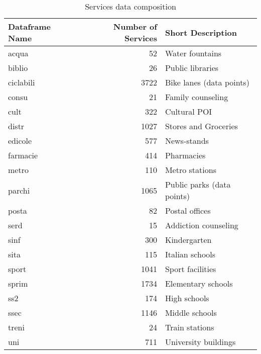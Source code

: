 \documentclass[12pt]{article}
\begin{document}
\begin{table}
	\centering
	\begin{tabular}{lrl}
		\toprule
		Dataframe Name&Number of Services&Short Description\\
		\midrule
		acqua&52& Water fountains\\
		biblio&26& Public libraries\\
		ciclabili&3722&Bike lanes (data points)\\
		consu&21&Family counseling\\
		cult&	322&Cultural POI\\
		distr&	1027&Stores and Groceries\\
		edicole&	577&News-stands\\
		farmacie&	414& Pharmacies\\
		metro&	110& Metro stations\\
		parchi&	1065& Public parks (data points)\\
		posta&	82& Postal offices\\
		serd&	15& Addiction counseling\\
		sinf&	300& Kindergarten\\ 
		sita&	115&Italian schools\\
		sport&	1041& Sport facilities\\
		sprim&	1734&Elementary schools\\
		ss2&174&High schools\\
		ssec&1146&Middle schools\\
		treni&24&Train stations\\
		uni&711&University buildings\\
		
		\bottomrule
	\end{tabular}
	\caption{Services data composition}
	\label{servtab}
\end{table}
\end{document}
